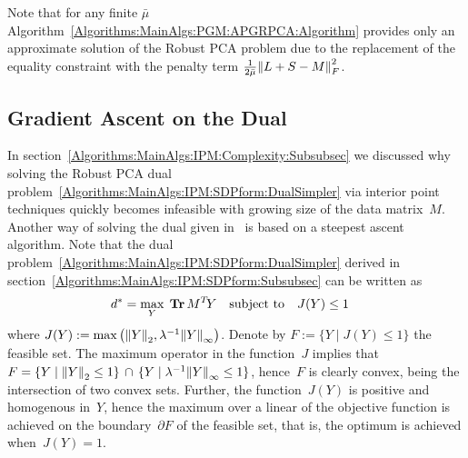 \documentclass{../../common/projectreport}
\begin{document}
\begin{remark}
Note that for any finite $\bar{\mu}$ Algorithm~\ref{Algorithms:MainAlgs:PGM:APGRPCA:Algorithm} provides only an approximate solution of the Robust PCA problem due to the replacement of the equality constraint with the penalty term $\frac{1}{2\bar{\mu}} {\left\|L+S-M\right\|}_{F}^{2}$.
\end{remark}


\subsection{Gradient Ascent on the Dual}
\label{Algorithms:MainAlgs:GAD:Subsec}

In section~\ref{Algorithms:MainAlgs:IPM:Complexity:Subsubsec} we discussed why solving the Robust PCA dual problem~\eqref{Algorithms:MainAlgs:IPM:SDPform:DualSimpler} via interior point techniques quickly becomes infeasible with growing size of the data matrix~$M$. Another way of solving the dual given in~\cite{Lin:2009kx} is based on a steepest ascent algorithm. Note that the dual problem~\eqref{Algorithms:MainAlgs:IPM:SDPform:DualSimpler} derived in section~\ref{Algorithms:MainAlgs:IPM:SDPform:Subsubsec} can be written as 
%
\begin{align}
d^* = \max_{Y} \; &\operatorname{\mathbf{Tr}} M^T\!Y \quad \text{subject to}\quad J(Y) \leq 1
\label{Algorithms:MainAlgs:GAD:Dual}
\end{align}
%
where $J(Y) := \max\left({\left\|Y\right\|}_{2}^{}, \lambda^{-1}{\left\|Y\right\|}_{\infty}^{}\right)$. Denote by $F := \{Y \mid J(Y)\leq1 \}$ the feasible set. The maximum operator in the function~$J$ implies that~$F=\{Y \mid {\left\|Y\right\|}_{2}^{}\leq1\}\, \cap\, \{Y \mid \lambda^{-1}{\left\|Y\right\|}_{\infty}^{}\leq1\}$, hence~$F$ is clearly convex, being the intersection of two convex sets. Further, the function~$J(Y)$ is positive and homogenous in~$Y$, hence the maximum over a linear of the objective function is achieved on the boundary~$\partial F$ of the feasible set, that is, the optimum is achieved when~$J(Y)=1$. 
\end{document}
